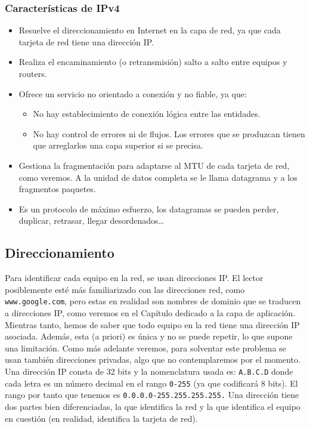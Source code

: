 \subsubsection{Características de \acrshort{IPv4}}
\begin{itemize}
    \item Resuelve el direccionamiento en Internet en la capa de red, ya que cada tarjeta de red tiene una dirección IP\@.
    \item Realiza el encaminamiento (o retransmisión) salto a salto entre equipos y routers.
    \item Ofrece un servicio no orientado a conexión y no fiable, ya que:
    \begin{itemize}
        \item No hay establecimiento de conexión lógica entre las entidades.
        \item No hay control de errores ni de flujos. Los errores que se produzcan tienen que arreglarlos una capa superior si se precisa.
    \end{itemize}
    \item Gestiona la fragmentación para adaptarse al \acrshort{MTU} de cada tarjeta de red, como veremos. A la unidad de datos completa se le llama datagrama y a los fragmentos paquetes. 
    \item Es un protocolo de máximo esfuerzo, los datagramas se pueden perder, duplicar, retrasar, llegar desordenados\ldots
\end{itemize}

\subsection{Direccionamiento}

Para identificar cada equipo en la red, se usan direcciones IP\@. El lector posiblemente esté más familiarizado con las direcciones red, como \verb|www.google.com|, pero estas en realidad son nombres de dominio que se traducen a direcciones IP\@, como veremos en el Capítulo dedicado a la capa de aplicación. Mientras tanto, hemos de saber que todo equipo en la red tiene una dirección IP asociada. Además, esta (a priori) es única y no se puede repetir, lo que supone una limitación. Como más adelante veremos, para solventar este problema se usan también direcciones privadas, algo que no contemplaremos por el momento.\\

Una dirección \acrshort{IP} consta de 32 bits y la nomenclatura usada es: \verb|A.B.C.D| donde cada letra es un número decimal en el rango \verb|0-255| (ya que codificará 8 bits). El rango por tanto que tenemos es \verb|0.0.0.0-255.255.255.255.| Una dirección tiene dos partes bien diferenciadas, la que identifica la red y la que identifica el equipo en cuestión (en realidad, identifica la tarjeta de red).\\

